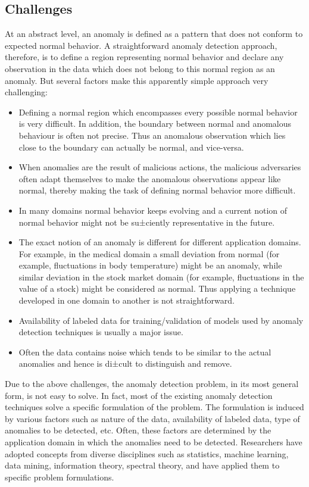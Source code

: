 \subsection{Challenges}
At an abstract level, an anomaly is defined as a pattern that does not conform 
to expected normal behavior. A straightforward anomaly detection approach, 
therefore, is to define a region representing normal behavior and declare any 
observation in the data which does not belong to this normal region as an 
anomaly. But several factors make this apparently simple approach very 
challenging:
\begin{itemize}
\item Defining a normal region which encompasses every possible normal behavior 
is very difficult. In addition, the boundary between normal and anomalous 
behaviour is often not precise. Thus an anomalous observation which lies close
to the boundary can actually be normal, and vice-versa.
\item When anomalies are the result of malicious actions, the malicious 
adversaries often adapt themselves to make the anomalous observations appear 
like normal, thereby making the task of defining normal behavior more difficult.
\item In many domains normal behavior keeps evolving and a current notion of
normal behavior might not be su±ciently representative in the future.
\item The exact notion of an anomaly is different for different application 
domains. For example, in the medical domain a small deviation from normal (for
example, fluctuations in body temperature) might be an anomaly, while similar 
deviation in the stock market domain (for example, fluctuations in the value of 
a stock) might be considered as normal. Thus applying a technique developed in 
one domain to another is not straightforward.
\item Availability of labeled data for training/validation of models used by 
anomaly detection techniques is usually a major issue.
\item Often the data contains noise which tends to be similar to the actual 
anomalies and hence is di±cult to distinguish and remove.
\end{itemize}

Due to the above challenges, the anomaly detection problem, in its most general
form, is not easy to solve. In fact, most of the existing anomaly detection 
techniques solve a specific formulation of the problem. The formulation is 
induced by various factors such as nature of the data, availability of labeled 
data, type of anomalies to be detected, etc. Often, these factors are determined
by the application domain in which the anomalies need to be detected. 
Researchers have adopted concepts from diverse disciplines such as statistics, 
machine learning, data mining, information theory, spectral theory, and have 
applied them to specific problem formulations.

